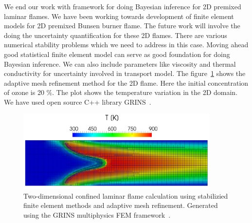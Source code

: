 We end our work with  framework for doing Bayesian inference for 2D premixed laminar flames. We have been working towards development of finite element models for 2D premixed Bunsen burner flame. The future work will involve the doing the uncertainty quantification for these 2D flames. There are various numerical stability problems which we need to address in this case. Moving ahead good statistical finite element model can serve as good foundation for doing Bayesian inference. We can also include parameters like viscosity and  thermal conductivity for uncertainty involved in transport model. The figure~\ref{amr_flame} shows the adaptive mesh refinement method for the 2D flame. Here the initial concentration of ozone is 20 $\%$.  The plot shows the temperature variation in the 2D domain. We have used open source C++ library GRINS~\cite{GRINSPaper}.

 \begin{figure}[h]
   \centering
   \includegraphics[width=0.9\textwidth]{figs/flame_grins_2}
    \caption{Two-dimensional confined laminar flame calculation using stabilizied finite element methods and adaptive mesh refinement. Generated using the GRINS multiphysics FEM framework~\cite{GRINSPaper}.}
    \label{amr_flame}
 \end{figure}

